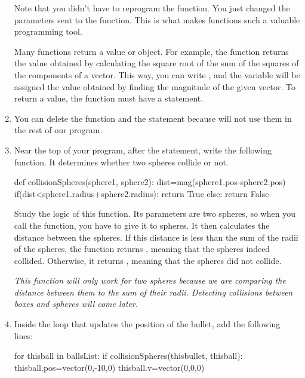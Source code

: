 \begin{enumerate}
Note that you didn't have to reprogram the function. You just changed the parameters sent to the function. This is what makes functions such a valuable programming tool.

Many functions return a value or object. For example, the  function returns the value obtained by calculating the square root of the sum of the squares of the components of a vector. This way, you can write , and the variable  will be assigned the value obtained by finding the magnitude of the given vector. To return a value, the function must have a  statement.

\item You can delete the  function and the  statement because will not use them in the rest of our program.

\item Near the top of your program, after the  statement, write the following function. It determines whether two spheres collide or not.

\begin{myvpython}
def collisionSpheres(sphere1, sphere2):
    dist=mag(sphere1.pos-sphere2.pos)
    if(dist<sphere1.radius+sphere2.radius):
        return True
    else:
        return False
\end{myvpython}

Study the logic of this function. Its parameters are two spheres, so when you call the function, you have to give it to spheres. It then calculates the distance between the spheres. If this distance is less than the sum of the radii of the spheres, the function returns , meaning that the spheres indeed collided. Otherwise, it returns , meaning that the spheres did not collide. 

\emph{This function will only work for two spheres because we are comparing the distance between them to the sum of their radii. Detecting collisions between boxes and spheres will come later.}

\item Inside the  loop that updates the position of the bullet, add the following lines:

\begin{myvpython}
        for thisball in ballsList:
            if collisionSpheres(thisbullet, thisball):
                thisball.pos=vector(0,-10,0)
                thisball.v=vector(0,0,0)
\end{myvpython}


\end{enumerate}
